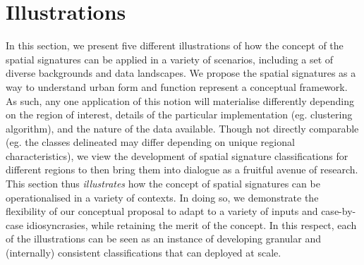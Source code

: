 \section{Illustrations}
\label{sec:app}



In this section, we present five different illustrations of how the concept of the spatial
signatures can be applied in a variety of scenarios, including a set of diverse
backgrounds and data landscapes.
We propose the spatial signatures as a way to understand urban form and function
represent a conceptual framework.
As such, any one application of this notion will materialise differently depending
on the region of interest, details of the particular implementation (eg. clustering algorithm),
and the nature of the data available.
%
Though not directly comparable (eg. the classes delineated may differ depending on unique 
regional characteristics), we view the development of spatial signature classifications for
different regions to then bring them into dialogue as a fruitful avenue of research.
This section thus \textit{illustrates} how the concept of
spatial signatures can be operationalised in a variety of contexts.
In doing so, we demonstrate the flexibility of our conceptual proposal to adapt to
a variety of inputs and case-by-case idiosyncrasies, while retaining the merit of
the concept.
%
In this respect, each of the illustrations can be seen as an instance of developing
granular and (internally) consistent classifications that can deployed at scale.

